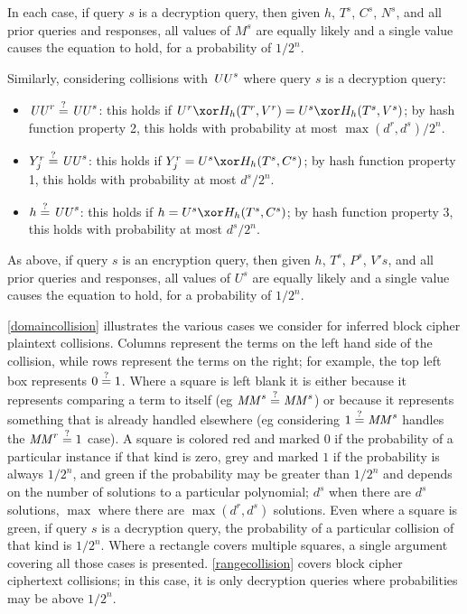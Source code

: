 \documentclass[hctr.tex]{subfiles}
\begin{document}
In each case, if query \(s\) is a decryption query,
then given \(h\), \(T^s\), \(C^s\), \(N^s\),
and all prior queries and responses,
all values of \(M^s\) are equally likely 
and a single value causes the equation to hold,
for a probability of \(1/2^n\).

Similarly, considering collisions with \(\mathit{UU}^s\) where
query \(s\) is a decryption query:

\begin{itemize}
    \item \(\mathit{UU}^r \stackrel{\text{?}}{=} \mathit{UU}^s\): 
    this holds if \(U^r \xor H_h(T^r, V^r) = U^s \xor H_h(T^s, V^s)\);
    by hash function property 2, this holds with probability at most
    \(\max(d^r, d^s)/2^n\).
    \item \(Y_j^r \stackrel{\text{?}}{=} \mathit{UU}^s\):
    this holds if \(Y_j^r = U^s \xor H_h(T^s, C^s)\);
    by hash function property 1, this holds with probability at most
    \(d^s/2^n\).
    \item \(h \stackrel{\text{?}}{=} \mathit{UU}^s\):
    this holds if \(h = U^s \xor H_h(T^s, C^s)\);
    by hash function property 3, this holds with probability at most
    \(d^s/2^n\).
\end{itemize}

As above, if query \(s\) is an encryption query,
then given \(h\), \(T^s\), \(P^s\), \(V's\),
and all prior queries and responses,
all values of \(U^s\) are equally likely
and a single value causes the equation to hold,
for a probability of \(1/2^n\).

\autoref{domaincollision} illustrates the various cases
we consider for inferred block cipher plaintext collisions.
Columns represent the terms
on the left hand side of the collision, while
rows represent the terms on the right; 
for example, the top left box represents
\(0 \stackrel{\text{?}}{=} 1\). Where a square is left blank
it is either because it represents
comparing a term to itself (eg \(\mathit{MM}^s \stackrel{\text{?}}{=} \mathit{MM}^s\))
or because it represents something that
is already handled elsewhere
(eg considering \(1 \stackrel{\text{?}}{=} \mathit{MM}^s\)
handles the \(\mathit{MM}^r \stackrel{\text{?}}{=} 1\) case).
A square is colored red
and marked \(0\) if the
probability of a particular instance
if that kind is zero, grey
and marked \(1\) if
the probability is always \(1/2^n\),
and green if the probability may be
greater than \(1/2^n\) and depends
on the number of solutions to a
particular polynomial;
\(d^s\) when there are \(d^s\) solutions,
\(\max\) where there are
\(\max(d^r, d^s)\) solutions.
Even where a square is green,
if query \(s\) is a decryption query,
the probability of a particular collision of
that kind is \(1/2^n\).
Where a rectangle covers
multiple squares, a single argument
covering all those cases is presented.
\autoref{rangecollision} covers
block cipher ciphertext collisions; in this case,
it is only decryption queries where
probabilities may be above \(1/2^n\).
\end{document}
